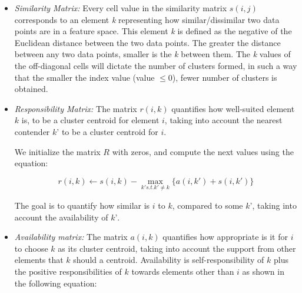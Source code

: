 \begin{itemize}

  \item\textit{Similarity Matrix:}
  Every cell value in the similarity matrix $s(i,j)$ corresponds to an element \textit{k} representing how similar/dissimilar two data points are in a feature space. This element \textit{k} is defined as the negative of the Euclidean distance between the two data points. The greater the distance between any two data points, smaller is the \textit{k} between them. The \textit{k} values of the off-diagonal cells will dictate the number of clusters formed, in such a way that the smaller the index value (value	$\leq$0), fewer number of clusters is obtained.
  \item\textit{Responsibility Matrix:} The matrix $r(i , k)$ quantifies how well-suited element $k$ is, to be a cluster centroid for element $i$, taking into account the nearest contender $k’$ to be a cluster centroid for $i$.
  
  We initialize the matrix $R$ with zeros, and compute the next values using the equation:

    \begin{equation}
        r(i, k) \leftarrow s(i, k) - \max\limits_{k' s.t. k' \neq k}\{ a(i, k') + s(i, k') \}
    \end{equation}
 
 The goal is to quantify how similar is $i$ to $k$, compared to some $k$’, taking into account the availability of $k’$.   
    
  \item\textit{Availability matrix:} The matrix $a(i,k)$ quantifies how appropriate is it for $i$ to choose $k$ as its cluster centroid, taking into account the support from other elements that $k$ should a centroid. Availability is self-responsibility of $k$ plus the positive responsibilities of $k$ towards elements other than $i$ as shown in the following equation:
  

\end{itemize}
